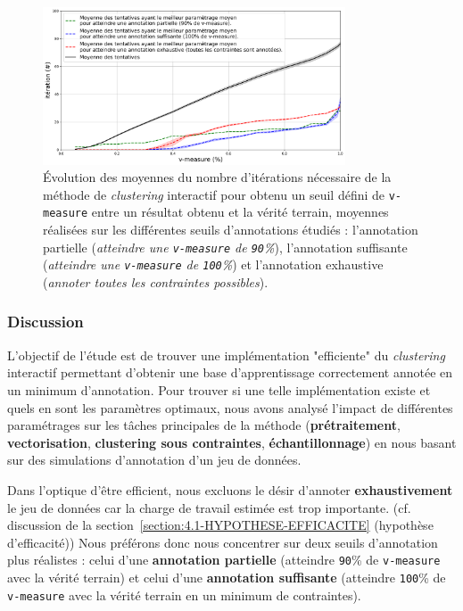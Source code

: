 			\begin{figure}[H]
				\centering
				\includegraphics[width=0.8\textwidth]{figures/etude-efficience-evolution-moyenne-5best-par-vmeasure}
				\caption{Évolution des moyennes du nombre d'itérations nécessaire de la méthode de \textit{clustering} interactif pour obtenu un seuil défini de \texttt{v-measure} entre un résultat obtenu et la vérité terrain, moyennes réalisées sur les différentes seuils d'annotations étudiés : l'annotation partielle (\textit{atteindre une \texttt{v-measure} de \texttt{90}\%}), l'annotation suffisante (\textit{atteindre une \texttt{v-measure} de \texttt{100}\%}) et l'annotation exhaustive (\textit{annoter toutes les contraintes possibles}).}
				\label{figure:4.2.1-ETUDE-OPTIMISATION-EVOLUTION-MEILLEUR-PARAMETRAGE}
			\end{figure}

		\subsubsection{Discussion}

			L'objectif de l'étude est de trouver une implémentation "efficiente" du \textit{clustering} interactif permettant d'obtenir une base d'apprentissage correctement annotée en un minimum d'annotation.
			Pour trouver si une telle implémentation existe et quels en sont les paramètres optimaux, nous avons analysé l'impact de différentes paramétrages sur les tâches principales de la méthode (\textbf{prétraitement}, \textbf{vectorisation}, \textbf{clustering sous contraintes}, \textbf{échantillonnage}) en nous basant sur des simulations d'annotation d'un jeu de données.
			
			Dans l'optique d'être efficient, nous excluons le désir d'annoter \textbf{exhaustivement} le jeu de données car la charge de travail estimée est trop importante.
			(cf. discussion de la section~\ref{section:4.1-HYPOTHESE-EFFICACITE} (hypothèse d'efficacité))
			Nous préférons donc nous concentrer sur deux seuils d'annotation plus réalistes : celui d'une \textbf{annotation partielle} (atteindre \texttt{90}\% de \texttt{v-measure} avec la vérité terrain) et celui d'une \textbf{annotation suffisante} (atteindre \texttt{100}\% de \texttt{v-measure} avec la vérité terrain en un minimum de contraintes). 
			
